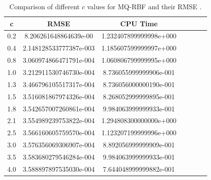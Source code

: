 \documentclass[12pt]{article}
\numberwithin{equation}{subsection} %
\begin{document}
\newpage
\begin{table}[h]
\centering \caption{Comparison of different $c$ values for MQ-RBF
and their RMSE .}\label{Tab_1DFinal}
\vspace{5mm}
\begin{tabular}{|c|c|c|c|c|c|c|}
  \hline
  c &  RMSE & CPU Time \\
  \hline

0.2 & 8.206261648864639e-00 & 1.232407899999998e+000  \\
  0.4 & 2.148128533777387e-003  &1.185607599999997e+000   \\
  0.8 & 3.060974866471791e-004  &1.060806799999995e+000 \\
  1.0 & 3.212911530746730e-004 &8.736055999999906e-001\\
  1.3 & 3.466796105517317e-004 & 8.736056000000190e-001 \\
  1.5 &3.516081867974326e-004  & 8.268052999999895e-001 \\
  1.8 &3.542657007260861e-004   &9.984063999999933e-001   \\
  2.1 & 3.554989239753822e-004  & 1.294808300000000e+000 \\
  2.5&3.566160605759570e-004 &1.123207199999996e+000\\
  3.0&3.576356069306907e-004 & 8.892056999999909e-001\\
  3.5&3.583680279546284e-004 &9.984063999999933e-001\\
  4.0& 3.588897897535030e-004&7.644048999999882e-001\\
  \hline

  \hline

\end{tabular}
\end{table}
\end{document}
